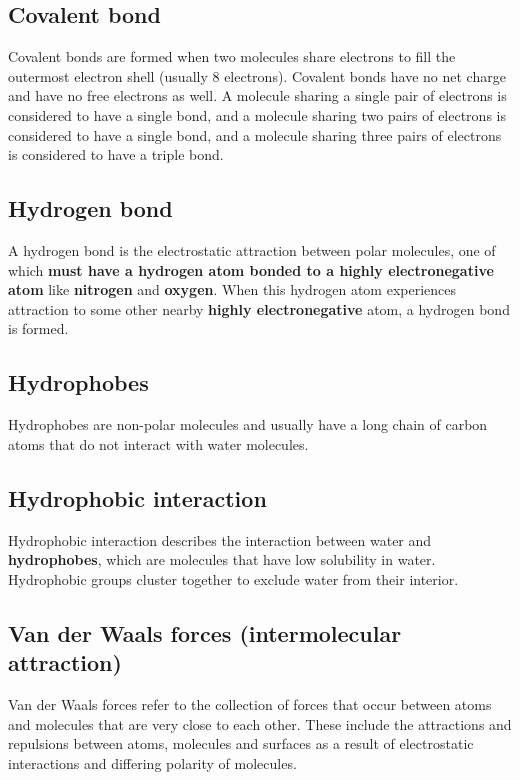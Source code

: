 \documentclass[11pt]{article}
\begin{document}
\subsection{Covalent bond}
\label{sec:org0caf288}
Covalent bonds are formed when two molecules share electrons to fill the outermost electron shell (usually 8 electrons). Covalent bonds have no net charge and have no free electrons as well. A molecule sharing a single pair of electrons is considered to have a single bond, and a molecule sharing two pairs of electrons is considered to have a single bond, and a molecule sharing three pairs of electrons is considered to have a triple bond.

\subsection{Hydrogen bond}
\label{sec:org7cfe851}
A hydrogen bond is the electrostatic attraction between polar molecules, one of which \textbf{must have a hydrogen atom bonded to a highly electronegative atom} like \textbf{nitrogen} and \textbf{oxygen}. When this hydrogen atom experiences attraction to some other nearby \textbf{highly electronegative} atom, a hydrogen bond is formed.

\subsection{Hydrophobes}
\label{sec:org6f6086e}
Hydrophobes are non-polar molecules and usually have a long chain of carbon atoms that do not interact with water molecules.

\subsection{Hydrophobic interaction}
\label{sec:orgfa07f7e}
Hydrophobic interaction describes the interaction between water and \textbf{hydrophobes}, which are molecules that have low solubility in water. Hydrophobic groups cluster together to exclude water from their interior.

\subsection{Van der Waals forces (intermolecular attraction)}
\label{sec:orgc45d869}
Van der Waals forces refer to the collection of forces that occur between atoms and molecules that are very close to each other. These include the attractions and repulsions between atoms, molecules and surfaces as a result of electrostatic interactions and differing polarity of molecules.
\end{document}
